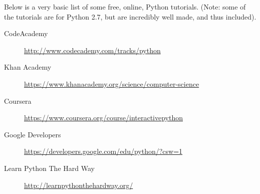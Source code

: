 \begin{fullwidth}

Below is a very basic list of some free, online, Python tutorials. (Note: some of the tutorials are for Python 2.7, but are incredibly well made, and thus included).

\begin{description}
\item[CodeAcademy] \url{http://www.codecademy.com/tracks/python}
\item[Khan Academy] \url{https://www.khanacademy.org/science/computer-science}
\item[Coursera] \url{https://www.coursera.org/course/interactivepython}
\item[Google Developers] \url{https://developers.google.com/edu/python/?csw=1}
\item[Learn Python The Hard Way] \url{http://learnpythonthehardway.org/}
\end{description}

\end{fullwidth}